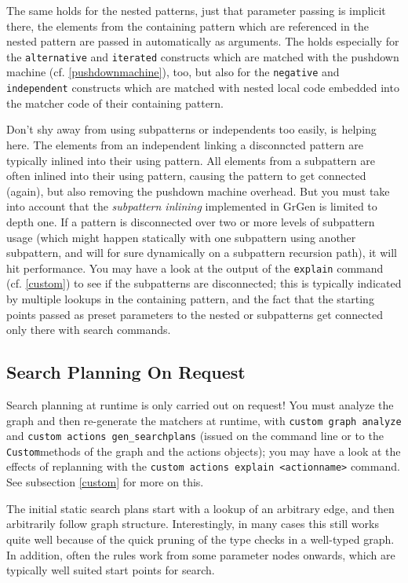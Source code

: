 The same holds for the nested patterns, just that parameter passing is implicit there, the elements from the containing pattern which are referenced in the nested pattern are passed in automatically as arguments.
The holds especially for the \texttt{alternative} and \texttt{iterated} constructs which are matched with the pushdown machine (cf. \ref{pushdownmachine}), too, but also for the \texttt{negative} and \texttt{independent} constructs which are matched with nested local code embedded into the matcher code of their containing pattern.

Don't shy away from using subpatterns or independents too easily,  is helping here. 
The elements from an independent linking a disconncted pattern are typically inlined into their using pattern.
All elements from a subpattern are often inlined into their using pattern, causing the pattern to get connected (again), 
but also removing the pushdown machine overhead.
But you must take into account that the \emph{subpattern inlining} implemented in GrGen is limited to depth one.
If a pattern is disconnected over two or more levels of subpattern usage (which might happen statically with one subpattern using another subpattern, and will for sure dynamically on a subpattern recursion path), it will hit performance.
You may have a look at the output of the \texttt{explain} command (cf. \ref{custom}) to see if the subpatterns are disconnected; this is typically indicated by multiple lookups in the containing pattern, and the fact that the starting points passed as preset parameters to the nested or subpatterns get connected only there with search commands.


\subsection{Search Planning On Request}
Search planning at runtime is only carried out on request!
You must analyze the graph and then re-generate the matchers at runtime,
with \texttt{custom graph analyze} and \texttt{custom actions gen\_searchplans} (issued on the command line or to the \texttt{Custom}methods of the graph and the actions objects);
you may have a look at the effects of replanning with the \texttt{custom actions explain <actionname>} command.
See subsection \ref{custom} for more on this.

The initial static search plans start with a lookup of an arbitrary edge, and then arbitrarily follow graph structure.
Interestingly, in many cases this still works quite well because of the quick pruning of the type checks in a well-typed graph.
In addition, often the rules work from some parameter nodes onwards, which are typically well suited start points for search.

